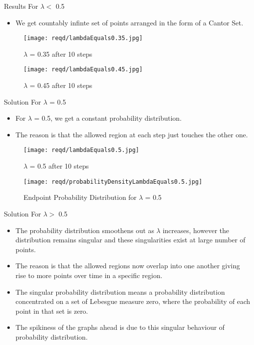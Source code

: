 \documentclass{beamer}
\begin{document}
\begin{frame}{Results For $\lambda<$ 0.5}
	\begin{itemize}
	\setlength\itemsep{1em}
		\item{\large We get countably infinte set of points arranged in the form of a Cantor Set.}
	\end{itemize}
	\pause
	\begin{figure}
    		\centering
    		\texttt{[image: reqd/lambdaEquals0.35.jpg]}
    		\caption{$\lambda$ = 0.35 after 10 steps}
	\end{figure}
	\pause
	\begin{figure}
    		\centering
    		\texttt{[image: reqd/lambdaEquals0.45.jpg]}
    		\caption{$\lambda$ = 0.45 after 10 steps}
	\end{figure}
	
\end{frame}

\begin{frame}{Solution For $\lambda$ = 0.5}
	\begin{itemize}
		\item{\large For $\lambda$ = 0.5, we get a constant probability distribution.}
		\item{\large The reason is that the allowed region at each step just touches the other one.}
	\end{itemize}
	\pause
	\begin{figure}
    		\centering
    		\texttt{[image: reqd/lambdaEquals0.5.jpg]}
    		\caption{$\lambda$ = 0.5 after 10 steps}
	\end{figure}
	\begin{figure}
    		\centering
    		\texttt{[image: reqd/probabilityDensityLambdaEquals0.5.jpg]}
    		\caption{Endpoint Probability Distribution for $\lambda$ = 0.5}
	\end{figure}
\end{frame}

\begin{frame}{Solution For $\lambda>$ 0.5}
	\begin{itemize}
	\setlength\itemsep{1em}
		\item{\large The probability distribution smoothens out as $\lambda$ increases, however the distribution remains singular and these singularities exist at large number of points.}
		\item{\large The reason is that the allowed regions now overlap into one another giving rise to more points over time in a specific region.}
		\item{\large The singular probability distribution means a probability distribution concentrated on a set of Lebesgue measure zero, where the probability of each point in that set is zero.}
		\item{\large The spikiness of the graphs ahead is due to this singular behaviour of probability distribution.}
	\end{itemize}
\end{frame}
\end{document}
